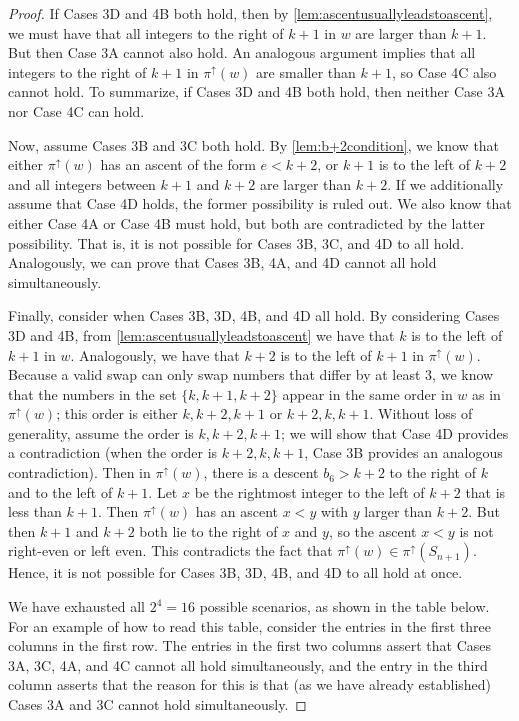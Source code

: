\documentclass[11pt]{amsart}
\theoremstyle{definition}
\begin{document}
\begin{proof}
    If Cases 3D and 4B both hold, then by \cref{lem:ascentusuallyleadstoascent}, we must have that all integers to the right of $k+1$ in $w$ are larger than $k+1$. But then Case 3A cannot also hold. An analogous argument implies that all integers to the right of $k+1$ in $\pi^\uparrow(w)$ are smaller than $k+1$, so Case 4C also cannot hold. To summarize, if Cases 3D and 4B both hold, then neither Case 3A nor Case 4C can hold.
    
    Now, assume Cases 3B and 3C both hold. By \cref{lem:b+2condition}, we know that either $\pi^\uparrow(w)$ has an ascent of the form $e<k+2$, or $k+1$ is to the left of $k+2$ and all integers between $k+1$ and $k+2$ are larger than $k+2$. If we additionally assume that Case 4D holds, the former possibility is ruled out. We also know that either Case 4A or Case 4B must hold, but both are contradicted by the latter possibility. That is, it is not possible for Cases 3B, 3C, and 4D to all hold. Analogously, we can prove that Cases 3B, 4A, and 4D cannot all hold simultaneously.
    
    Finally, consider when Cases 3B, 3D, 4B, and 4D all hold. By considering Cases 3D and 4B, from \cref{lem:ascentusuallyleadstoascent} we have that $k$ is to the left of $k+1$ in $w$. Analogously, we have that $k+2$ is to the left of $k+1$ in $\pi^\uparrow(w)$. Because a valid swap can only swap numbers that differ by at least $3$, we know that the numbers in the set $\{k,k+1,k+2\}$ appear in the same order in $w$ as in $\pi^\uparrow(w)$; this order is either $k, k+2, k+1$ or $k+2, k, k+1$. Without loss of generality, assume the order is $k, k+2, k+1$; we will show that Case 4D provides a contradiction (when the order is $k+2, k, k+1$, Case 3B provides an analogous contradiction). Then in $\pi^\uparrow(w)$, there is a descent $b_6>k+2$ to the right of $k$ and to the left of $k+1$. Let $x$ be the rightmost integer to the left of $k+2$ that is less than $k+1$. Then $\pi^\uparrow(w)$ has an ascent $x<y$ with $y$ larger than $k+2$. But then $k+1$ and $k+2$ both lie to the right of $x$ and $y$, so the ascent $x<y$ is not right-even or left even. This contradicts the fact that $\pi^\uparrow(w)\in\pi^\uparrow(S_{n+1})$. Hence, it is not possible for Cases 3B, 3D, 4B, and 4D to all hold at once.
    
    We have exhausted all $2^4=16$ possible scenarios, as shown in the table below. For an example of how to read this table, consider the entries in the first three columns in the first row. The entries in the first two columns assert that Cases 3A, 3C, 4A, and 4C cannot all hold simultaneously, and the entry in the third column asserts that the reason for this is that (as we have already established) Cases 3A and 3C cannot hold simultaneously. 


\end{proof}
\end{document}
